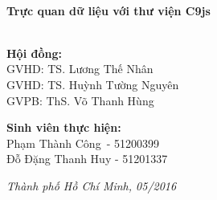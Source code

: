 \begin{titlepage}
\HRule \\[0.4cm]
{ \huge \bfseries Trực quan dữ liệu với thư viện C9js}\\[0.4cm] %
\HRule \\[0.8cm]

\begin{flushright}
\begin{minipage}{0.7\textwidth}

\end{minipage}
\end{flushright}

\begin{flushleft} \large
\textbf{Hội đồng:}\\
\tab[2cm] GVHD: TS. Lương Thế Nhân\\
\tab[2cm] GVHD: TS. Huỳnh Tường Nguyên\\
\tab[2cm] GVPB: ThS. Võ Thanh Hùng\\
\end{flushleft}

\begin{flushleft} \large
\textbf{Sinh viên thực hiện:}\\
\tab[2cm] Phạm Thành Công\quad \ - 51200399\\
\tab[2cm] Đỗ Đặng Thanh Huy - 51201337\\[1.5cm]
\end{flushleft}


\large \emph{Thành phố Hồ Chí Minh, 05/2016}

\vfill %

\end{titlepage}